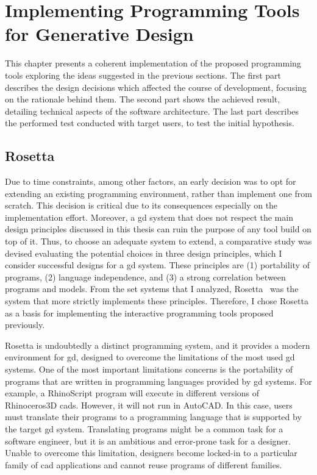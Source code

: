 
\chapter{Implementing Programming Tools for Generative Design}
\label{chapter:evaluation}

This chapter presents a coherent implementation of the proposed programming tools exploring the ideas suggested in the previous sections. The first part describes the design decisions which affected the course of development, focusing on the rationale behind them. The second part shows the achieved result, detailing technical aspects of the software architecture. The last part describes the performed test conducted with target users, to test the initial hypothesis.

\section{Rosetta}

Due to time constraints, among other factors, an early decision was to opt for extending an existing programming environment, rather than implement one from scratch. This decision is critical due to its consequences especially on the implementation effort. Moreover, a \gls{gd} system that does not respect the main design principles discussed in this thesis can ruin the purpose of any tool build on top of it. Thus, to choose an adequate system to extend,
a comparative study was devised evaluating the potential choices in three design principles, which I consider successful designs for a \gls{gd} system. These principles are (1) portability of programs, (2) language independence, and (3) a strong correlation between programs and models. From the set systems that I analyzed, Rosetta~\citep{lopes2011portable} was the system that more strictly implements these principles. Therefore, I chose Rosetta as a basis for implementing the interactive programming tools proposed previously.

Rosetta is undoubtedly a distinct programming system, and it provides a modern environment for \gls{gd}, designed to overcome the limitations of the most used \gls{gd} systems. One of the most important limitations concerns is the portability of programs that are written in programming languages provided by \gls{gd} systems. For example, a RhinoScript program will execute in different versions of Rhinoceros3D \glspl{cad}. However, it will not run in AutoCAD. In this case, users must translate their programs to a programming language that is supported by the target \gls{gd} system. Translating programs might be a common task for a software engineer, but it is an ambitious and error-prone task for a designer. Unable to overcome this limitation, designers become locked-in to a particular family of \gls{cad} applications and cannot reuse programs of different families.


